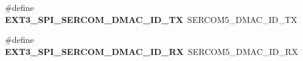 \begin{DoxyCompactItemize}
\item 
\hypertarget{group__saml21__xplained__pro__features__group_ga79fe256857e45d2a7cafbc66997cae98}{}\#define {\bfseries E\+X\+T3\+\_\+\+S\+P\+I\+\_\+\+S\+E\+R\+C\+O\+M\+\_\+\+D\+M\+A\+C\+\_\+\+I\+D\+\_\+\+T\+X}~S\+E\+R\+C\+O\+M5\+\_\+\+D\+M\+A\+C\+\_\+\+I\+D\+\_\+\+T\+X\label{group__saml21__xplained__pro__features__group_ga79fe256857e45d2a7cafbc66997cae98}

\item 
\hypertarget{group__saml21__xplained__pro__features__group_ga3f1449f5a3664f6d79cc87bec6b19363}{}\#define {\bfseries E\+X\+T3\+\_\+\+S\+P\+I\+\_\+\+S\+E\+R\+C\+O\+M\+\_\+\+D\+M\+A\+C\+\_\+\+I\+D\+\_\+\+R\+X}~S\+E\+R\+C\+O\+M5\+\_\+\+D\+M\+A\+C\+\_\+\+I\+D\+\_\+\+R\+X\label{group__saml21__xplained__pro__features__group_ga3f1449f5a3664f6d79cc87bec6b19363}

\end{DoxyCompactItemize}
